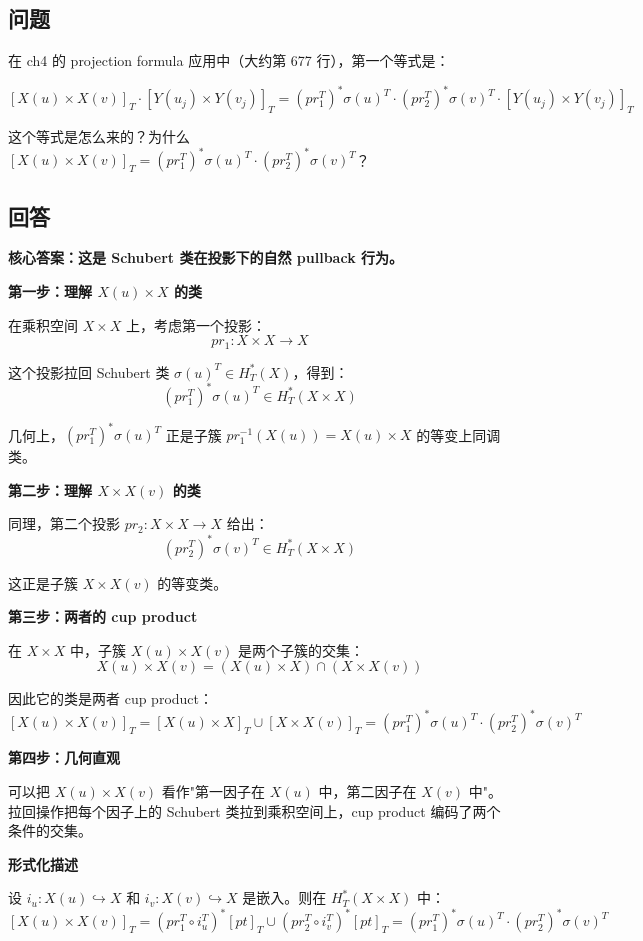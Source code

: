 \subsection{问题}
在 ch4 的 projection formula 应用中（大约第 677 行），第一个等式是：

$$[X(u) \times X(v)]_T \cdot [Y(u_j) \times Y(v_j)]_T = (pr_1^T)^* \sigma(u)^T \cdot (pr_2^T)^* \sigma(v)^T \cdot [Y(u_j) \times Y(v_j)]_T$$

这个等式是怎么来的？为什么 $[X(u) \times X(v)]_T = (pr_1^T)^* \sigma(u)^T \cdot (pr_2^T)^* \sigma(v)^T$？

\subsection{回答}
\textbf{核心答案：这是 Schubert 类在投影下的自然 pullback 行为。}

\textbf{第一步：理解 $X(u) \times X$ 的类}

在乘积空间 $X \times X$ 上，考虑第一个投影：
$$pr_1: X \times X \to X$$

这个投影拉回 Schubert 类 $\sigma(u)^T \in H_T^*(X)$，得到：
$$(pr_1^T)^* \sigma(u)^T \in H_T^*(X \times X)$$

几何上，$(pr_1^T)^* \sigma(u)^T$ 正是子簇 $pr_1^{-1}(X(u)) = X(u) \times X$ 的等变上同调类。

\textbf{第二步：理解 $X \times X(v)$ 的类}

同理，第二个投影 $pr_2: X \times X \to X$ 给出：
$$(pr_2^T)^* \sigma(v)^T \in H_T^*(X \times X)$$

这正是子簇 $X \times X(v)$ 的等变类。

\textbf{第三步：两者的 cup product}

在 $X \times X$ 中，子簇 $X(u) \times X(v)$ 是两个子簇的交集：
$$X(u) \times X(v) = (X(u) \times X) \cap (X \times X(v))$$

因此它的类是两者 cup product：
$$[X(u) \times X(v)]_T = [X(u) \times X]_T \cup [X \times X(v)]_T = (pr_1^T)^* \sigma(u)^T \cdot (pr_2^T)^* \sigma(v)^T$$

\textbf{第四步：几何直观}

可以把 $X(u) \times X(v)$ 看作"第一因子在 $X(u)$ 中，第二因子在 $X(v)$ 中"。拉回操作把每个因子上的 Schubert 类拉到乘积空间上，cup product 编码了两个条件的交集。

\textbf{形式化描述}

设 $i_u: X(u) \hookrightarrow X$ 和 $i_v: X(v) \hookrightarrow X$ 是嵌入。则在 $H_T^*(X \times X)$ 中：
$$[X(u) \times X(v)]_T = (pr_1^T \circ i_u^T)^*[pt]_T \cup (pr_2^T \circ i_v^T)^*[pt]_T = (pr_1^T)^* \sigma(u)^T \cdot (pr_2^T)^* \sigma(v)^T$$

